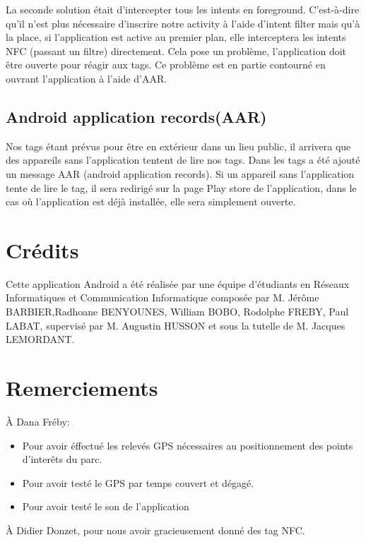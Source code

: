 \documentclass[a4paper,11pt]{article}
\begin{document}
      La seconde solution était d’intercepter tous les intents en foreground. 
      C'est-à-dire qu’il n’est plus nécessaire d’inscrire notre activity à l’aide d’intent filter mais qu’à la place, 
      si l’application est active au premier plan, elle interceptera les intents NFC (passant un filtre) directement. 
      Cela pose un problème, l’application doit être ouverte pour réagir aux tags. 
      Ce problème est en partie contourné en ouvrant l’application à l’aide d’AAR.
      
      \subsection{Android application records(AAR)}
      Nos tags étant prévus pour être en extérieur dans un lieu public, il arrivera que des appareils sans l’application tentent de lire nos tags. 
      Dans les tags a été ajouté un message AAR (android application records). 
      Si un appareil sans l’application tente de lire le tag, il sera redirigé sur la page Play store de l’application, 
      dans le cas où l’application est déjà installée, elle sera simplement ouverte.
    
    \section{Crédits}
		
    Cette application Android a été réalisée par une équipe d'étudiants en Réseaux Informatiques et Communication Informatique composée par 
    M. Jérôme BARBIER,Radhoane BENYOUNES, William BOBO, Rodolphe FREBY, Paul LABAT, supervisé par M. Augustin HUSSON et sous la tutelle 
    de M. Jacques LEMORDANT.

    \section{Remerciements}
    À Dana Fréby:
    \begin{itemize}
     \item Pour avoir éffectué les relevés GPS nécessaires au positionnement des points d'interêts du parc.
     \item Pour avoir testé le GPS par temps couvert et dégagé. 
     \item Pour avoir testé le son de l'application
    \end{itemize}
    
  À Didier Donzet, pour nous avoir gracieusement donné des tag NFC.
\end{document}
